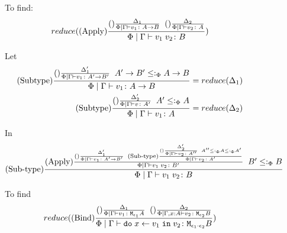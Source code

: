 \documentclass{Report}
\begin{document}

\begin{figure}
    \begin{framed}
    To find:
    \begin{equation}
        reduce((\text{Apply}) \frac{
            (\text{}) \frac{\Delta_1}{
                \Phi\mid\Gamma \vdash v_1 \colon A\rightarrow B
            }
            \;\;
            (\text{}) \frac{\Delta_2}{
                \Phi\mid\Gamma \vdash v_2 \colon A
            }
        }{
            \Phi\mid\Gamma \vdash v_1\; v_2 \colon B
        })
    \end{equation}

    Let
    \begin{align}
        (\text{Subtype}) \frac{
            (\text{}) \frac{\Delta'_1}{\Phi\mid\Gamma \vdash v_1 \colon A'\rightarrow B'}
            \;\;
            A'\rightarrow B'\leq:_\Phi A\rightarrow B
        }{
            \Phi\mid\Gamma \vdash v_1 \colon A\rightarrow B
        } & = reduce(\Delta_1)\\
        (\text{Subtype}) \frac{
            (\text{}) \frac{\Delta'_2}{\Phi\mid\Gamma \vdash v \colon A'}
            \;\;
            A'\leq:_\Phi A
        }{
            \Phi\mid\Gamma \vdash v_1 \colon A
        } & = reduce(\Delta_2)
    \end{align}

    In
    \begin{equation}
        (\text{Sub-type}) \frac{
            (\text{Apply}) \frac{
                (\text{}) \frac{
                    \Delta'_1
                }{
                    \Phi\mid\Gamma \vdash v_1 \colon A'\rightarrow B'
                }
            \;\;
                (\text{Sub-type}) \frac{
                    (\text{}) \frac{\Delta'_2}{\Phi\mid\Gamma \vdash v_2 \colon A''}
                    \;\;
                    A'' \leq:_\Phi A \leq:_\Phi A'
                }{
                    \Phi\mid\Gamma \vdash v_2 \colon A'
                }
            }{
                \Phi\mid\Gamma \vdash v_1\; v_2 \colon B'
            }
            \;\;
            B' \leq:_\Phi B
        }{
            \Phi\mid\Gamma \vdash v_1\; v_2 \colon B
        }
    \end{equation}



    To find
    \begin{equation}
        reduce(
            (\text{Bind}) \frac{
                (\text{}) \frac{
                    \Delta_1
                }{
                    \Phi\mid\Gamma \vdash v_1 \colon \texttt{M}_{\epsilon_1}{A}
                }
                \;\;
                (\text{}) \frac{
                    \Delta_2
                }{
                    \Phi\mid\Gamma, x: A \vdash v_2 \colon \texttt{M}_{\epsilon_2}{B}
                }
            }{
                \Phi\mid\Gamma \vdash \texttt{do}\; x \leftarrow v_1 \;\texttt{in}\; v_2 \colon \texttt{M}_{\epsilon_1\cdot\epsilon_2}{B}
            }
        )
    \end{equation}



\end{framed}
\end{figure}
\end{document}
